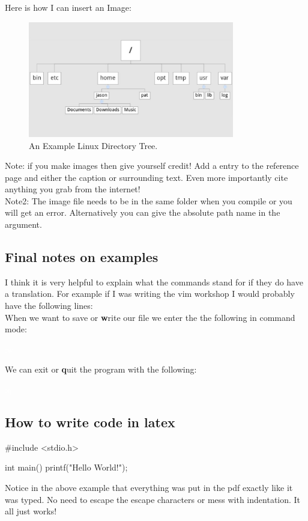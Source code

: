 \documentclass{book}
\newcommand{\examplein}[1]{\begin{center} \colorbox{Dark}{\textcolor{white}{#1}} \end{center}}
\begin{document}
Here is how I can insert an Image: \\
\begin{figure}[ht!]
	\centering
	\includegraphics[width=90mm]{linux-directory-tree.jpg}
	\caption{An Example Linux Directory Tree.} 
\end{figure}
Note: if you make images then give yourself credit! Add a entry to the reference page and either the caption or surrounding text. Even more importantly cite anything you grab from the internet! \\
Note2: The image file needs to be in the same folder when you compile or you will get an error. Alternatively you can give the absolute path name in the argument. \\

\subsection{Final notes on examples}
	I think it is very helpful to explain what the commands stand for if they do have a translation. For example if I was writing the vim workshop I would probably have the following lines: \\
	When we want to save or \textbf{w}rite our file we enter the the following in command mode:
	\examplein{:w}
	We can exit or \textbf{q}uit the program with the following:
	\examplein{:q}

\subsection{How to write code in latex}
\begin{verbatimtab}
	#include <stdio.h>

	int main() {
		printf("Hello World!");
	}
\end{verbatimtab}
Notice in the above example that everything was put in the pdf exactly like it was typed. No need to escape the escape characters or mess with indentation. It all just works!
\end{document}
